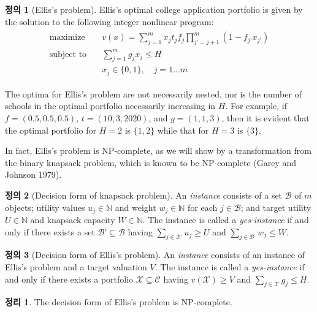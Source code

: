 \documentclass[12pt]{article} %
\newtheorem{theorem}{Theorem}
\theoremstyle{definition}
\newtheorem{definition}{Definition}
\newtheorem{theorem}{정리}
\theoremstyle{definition}
\newtheorem{definition}{정의}
\begin{document}
\begin{definition}[Ellis's problem]
Ellis's optimal college application portfolio is given by the solution to the following integer nonlinear program:
\begin{align}
\begin{split}
\text{maximize}\quad & v(x) = \sum_{j=1}^m x_j t_j f_j \prod_{j’ = j+1}^m (1 - f_{j’} x_{j’}) \\
\text{subject to}\quad & \sum_{j=1}^m g_j x_j \leq H \\
&x_j \in \{0, 1\}, \quad j = 1\dots m
\end{split}
\end{align}
\end{definition}

The optima for Ellis's problem are not necessarily nested, nor is the number of schools in the optimal portfolio necessarily increasing in $H$. For example, if
$f = (0.5, 0.5, 0.5)$, $t = (10, 3, 2020)$, and $g = (1, 1, 3)$,
then it is evident that the optimal portfolio for $H = 2$ is $\{1, 2\}$ while that for $H = 3$ is $\{3\}$. 

In fact, Ellis’s problem is NP-complete, as we will show by a transformation from the binary knapsack problem, which is known to be NP-complete (Garey and Johnson 1979).

\begin{definition}[Decision form of knapsack problem]
An \emph{instance} consists of a set $\mathcal{B}$ of $m$ objects; utility values $u_j \in \mathbb{N}$ and weight $w_j \in \mathbb{N}$ for each $j \in \mathcal{B}$; and target utility $U\in \mathbb{N}$ and knapsack capacity $W\in \mathbb{N}$. The instance is called a \emph{yes-instance} if and only if there exists a set $\mathcal{B’} \subseteq \mathcal{B}$ having $\sum_{j \in \mathcal{B’}} u_j \geq U$ and  $\sum_{j \in \mathcal{B’}} w_j \leq W$.
\end{definition}

\begin{definition}[Decision form of Ellis’s problem]
An \emph{instance} consists of an instance of Ellis’s problem and a target valuation $V$. The instance is called a \emph{yes-instance} if and only if there exists a portfolio $\mathcal{X} \subseteq \mathcal{C}$ having $v(\mathcal{X}) \geq V$ and  $\sum_{j \in \mathcal{X}} g_j \leq H$.
\end{definition}

\begin{theorem}
The decision form of Ellis’s problem is NP-complete.
\end{theorem}
\end{document}
